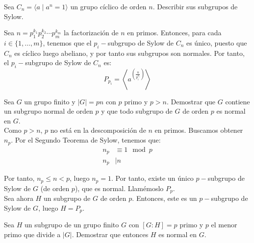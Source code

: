 \begin{ejercicio}\label{ej:6.14}
    Sea $C_n = \langle a \mid a^n = 1 \rangle$ un grupo cíclico de orden $n$. Describir sus subgrupos de Sylow.


    Sea $n=p_1^{k_1}p_2^{k_2}\cdots p_m^{k_m}$ la factorización de $n$ en primos. Entonces, para cada $i\in \{1,\ldots,m\}$, tenemos que el $p_i-$subgrupo de Sylow de $C_n$ es único, puesto que $C_n$ es cíclico luego abeliano, y por tanto sus subgrupos son normales. Por tanto, el $p_i-$subgrupo de Sylow de $C_n$ es:
    \begin{equation*}
        P_{p_i} = \left\langle a^{\left(\frac{n}{p_i^{k_i}}\right)} \right\rangle
    \end{equation*}
\end{ejercicio}

\begin{ejercicio}\label{ej:6.15}
    Sea $G$ un grupo finito y $|G| = pn$ con $p$ primo y $p > n$. Demostrar que $G$ contiene un subgrupo normal de orden $p$ y que todo subgrupo de $G$ de orden $p$ es normal en $G$.\\

    Como $p>n$, $p$ no está en la descomposición de $n$ en primos. Buscamos obtener $n_p$. Por el Segundo Teorema de Sylow, tenemos que:
    \begin{align*}
        n_p &\equiv 1 \mod p \\
        n_p &\mid n
    \end{align*}

    Por tanto, $n_p\leq n<p$, luego $n_p=1$. Por tanto, existe un único $p-$subgrupo de Sylow de $G$ (de orden $p$), que es normal. Llamémoslo $P_p$.\\

    Sea ahora $H$ un subgrupo de $G$ de orden $p$. Entonces, este es un $p-$subgrupo de Sylow de $G$, luego $H=P_p$.
\end{ejercicio}

\begin{ejercicio}\label{ej:6.16}
    Sea $H$ un subgrupo de un grupo finito $G$ con $[G : H] = p$ primo y $p$ el menor primo que divide a $|G|$. Demostrar que entonces $H$ es normal en $G$.

\end{ejercicio}

